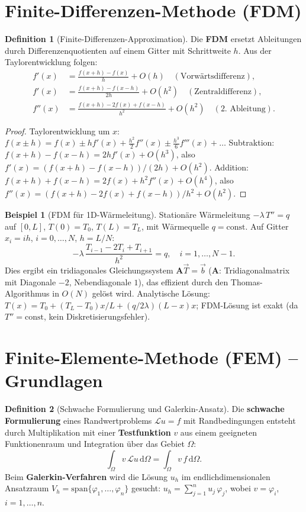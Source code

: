 ﻿\documentclass[a4paper,12pt]{report}
\theoremstyle{definition}
\newtheorem{definition}{Definition}
\newtheorem{beispiel}{Beispiel}
\begin{document}

\section{Finite-Differenzen-Methode (FDM)}

\begin{definition}[Finite-Differenzen-Approximation]
Die \textbf{FDM} ersetzt Ableitungen durch Differenzenquotienten auf einem
Gitter mit Schrittweite $h$. Aus der Taylorentwicklung folgen:
\begin{align*}
  f'(x) &= \frac{f(x+h) - f(x)}{h} + O(h) \quad (\text{Vorwärtsdifferenz}),\\
  f'(x) &= \frac{f(x+h) - f(x-h)}{2h} + O(h^2) \quad (\text{Zentraldifferenz}),\\
  f''(x) &= \frac{f(x+h) - 2f(x) + f(x-h)}{h^2} + O(h^2) \quad (\text{2.\ Ableitung}).
\end{align*}
\end{definition}
\begin{proof}
Taylorentwicklung um $x$:
$f(x\pm h) = f(x) \pm hf'(x) + \tfrac{h^2}{2}f''(x) \pm \tfrac{h^3}{6}f'''(x) + \ldots$
Subtraktion: $f(x+h)-f(x-h) = 2hf'(x) + O(h^3)$, also $f'(x) = (f(x+h)-f(x-h))/(2h) + O(h^2)$.
Addition: $f(x+h)+f(x-h) = 2f(x) + h^2 f''(x) + O(h^4)$, also
$f''(x) = (f(x+h)-2f(x)+f(x-h))/h^2 + O(h^2)$.
\end{proof}

\begin{beispiel}[FDM für 1D-Wärmeleitung]
Stationäre Wärmeleitung $-\lambda\,T'' = q$ auf $[0,L]$,
$T(0) = T_0$, $T(L) = T_L$, mit Wärmequelle $q = \mathrm{const}$.
Auf Gitter $x_i = ih$, $i = 0,\ldots,N$, $h = L/N$:
\[
  -\lambda\,\frac{T_{i-1} - 2T_i + T_{i+1}}{h^2} = q, \quad i = 1,\ldots,N-1.
\]
Dies ergibt ein tridiagonales Gleichungssystem $\mathbf{A}\vec{T} = \vec{b}$
($\mathbf{A}$: Tridiagonalmatrix mit Diagonale $-2$, Nebendiagonale $1$),
das effizient durch den Thomas-Algorithmus in $O(N)$ gelöst wird.
Analytische Lösung: $T(x) = T_0 + (T_L-T_0)x/L + (q/2\lambda)(L-x)x$;
FDM-Lösung ist exakt (da $T''=\mathrm{const}$, kein Diskretisierungsfehler).
\end{beispiel}

\section{Finite-Elemente-Methode (FEM) -- Grundlagen}

\begin{definition}[Schwache Formulierung und Galerkin-Ansatz]
Die \textbf{schwache Formulierung} eines Randwertproblems
$\mathcal{L}u = f$ mit Randbedingungen entsteht durch Multiplikation
mit einer \textbf{Testfunktion} $v$ aus einem geeigneten Funktionenraum
und Integration über das Gebiet $\Omega$:
\[
  \int_\Omega v\,\mathcal{L}u\,\mathrm{d}\Omega = \int_\Omega v\,f\,\mathrm{d}\Omega.
\]
Beim \textbf{Galerkin-Verfahren} wird die Lösung $u_h$ im endlichdimensionalen
Ansatzraum $V_h = \mathrm{span}\{\varphi_1,\ldots,\varphi_n\}$ gesucht:
$u_h = \sum_{j=1}^n u_j\,\varphi_j$, wobei $v = \varphi_i$, $i = 1,\ldots,n$.
\end{definition}
\end{document}
